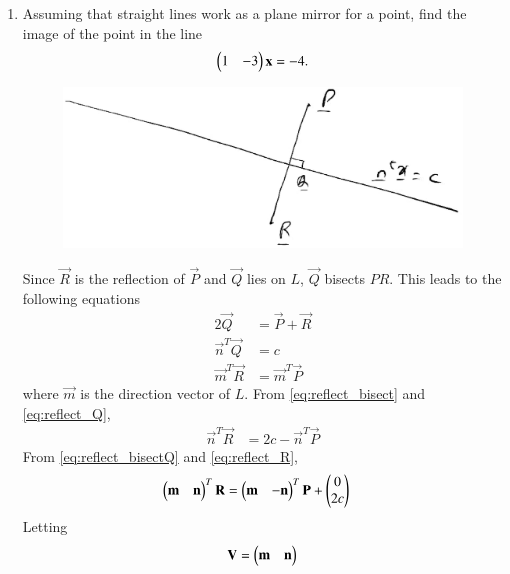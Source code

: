 \begin{enumerate}[label=\arabic*.,ref=\thesubsection.\theenumi]
\item Assuming that straight lines work as a plane mirror for a point, find the image of the point  in the line 
%
\begin{align}
\begin{pmatrix}1 & -3\end{pmatrix}\mathbf{x}  = -4.
\end{align}
%
%
\begin{figure}
\centering
\includegraphics[width=\columnwidth]{./line/figs/reflection.eps}
\caption{}
\label{fig:line_reflection}
\end{figure}
\solution Since $\vec{R}$ is the reflection of $\vec{P}$ and $\vec{Q}$ lies on $L$, $\vec{Q}$ bisects $PR$.  
This leads to the following equations
\begin{align}
\label{eq:reflect_bisect}
2\vec{Q} &= \vec{P}+\vec{R}
\\
\label{eq:reflect_Q}
\vec{n}^{T}\vec{Q} &= c
\\
\label{eq:reflect_R}
\vec{m}^{T}\vec{R} &= \vec{m}^{T}\vec{P}
\end{align}
%
where $\vec{m}$ is the direction vector of $L$.  From \eqref{eq:reflect_bisect} and \eqref{eq:reflect_Q},
\begin{align}
\label{eq:reflect_bisectQ}
\vec{n}^{T}\vec{R}  &= 2c - \vec{n}^{T}\vec{P}
\end{align}
%
From \eqref{eq:reflect_bisectQ} and \eqref{eq:reflect_R},
\begin{align}
\label{eq:reflect_bisectQR}
\begin{pmatrix}\mathbf{m} & \mathbf{n}\end{pmatrix}^T\mathbf{R} &= \begin{pmatrix}\mathbf{m} & -\mathbf{n}\end{pmatrix}^T\mathbf{P}+ \begin{pmatrix}0 \\ 2c\end{pmatrix}
\end{align}
%
Letting 
\begin{align}
\label{eq:reflect_mat}
\mathbf{V}=  \begin{pmatrix}\mathbf{m} & \mathbf{n}\end{pmatrix}
\end{align}

\end{enumerate}

